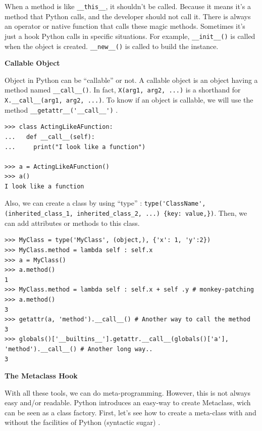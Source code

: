 \documentclass[a4paper,10pt]{article}
\begin{document}
When a method is like \lstinline|__this__|, it shouldn't be called.
Because it means it's a method that Python calls, and the developer should not call it.
There is always an operator or native function that calls these magic methods.
Sometimes it's just a hook Python calls in specific situations.
For example, \lstinline|__init__()| is called when the object is created.
\lstinline|__new__()| is called to build the instance.

\textbf{Callable Object}

Object in Python can be “callable” or not. A callable object is an object having a method named \lstinline|__call__()|. In fact, \lstinline|X(arg1, arg2, ...)| is a shorthand for \lstinline|X.__call__(arg1, arg2, ...)|. To know if an object is callable, we will use the method \lstinline|__getattr__('__call__')| \cite{ python:callable}.

\begin{lstlisting}
>>> class ActingLikeAFunction:
...   def __call__(self):
...     print("I look like a function")

>>> a = ActingLikeAFunction()
>>> a()
I look like a function
\end{lstlisting}

Also, we can create a class by using ``type'' : \lstinline|type('ClassName', (inherited_class_1, inherited_class_2, ...) {key: value,})|. Then, we can add attributes or methods to this class.

\begin{lstlisting}
>>> MyClass = type('MyClass', (object,), {'x': 1, 'y':2})
>>> MyClass.method = lambda self : self.x
>>> a = MyClass()
>>> a.method()
1
>>> MyClass.method = lambda self : self.x + self .y # monkey-patching
>>> a.method()
3
>>> getattr(a, 'method').__call__() # Another way to call the method
3
>>> globals()['__builtins__'].getattr.__call__(globals()['a'], 'method').__call__() # Another long way..
3
\end{lstlisting}

\textbf{The Metaclass Hook}

With all these tools, we can do meta-programming.
However, this is not always easy and/or readable.
Python introduces an easy-way to create Metaclass, wich can be seen as a class factory.
First, let's see how to create a meta-class with and without the facilities of Python (syntactic sugar) \cite{python:metaclasses}.
\end{document}
